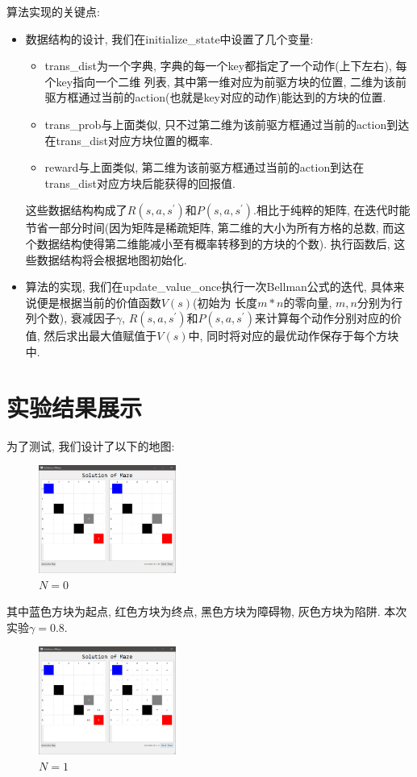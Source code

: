 \documentclass{acm_proc_article-sp}
\begin{document}
算法实现的关键点:
\begin{itemize}
    \item 数据结构的设计, 我们在\textsf{initialize\_state}中设置了几个变量: 
    \begin{itemize}
        \item \textsf{trans\_dist}为一个字典, 字典的每一个key都指定了一个动作(上下左右), 每个key指向一个二维
        列表, 其中第一维对应为前驱方块的位置, 二维为该前驱方框通过当前的action(也就是key对应的动作)能达到的方块的位置.
        \item \textsf{trans\_prob}与上面类似, 只不过第二维为该前驱方框通过当前的action到达在\textsf{trans\_dist}对应方块位置的概率.
        \item \textsf{reward}与上面类似, 第二维为该前驱方框通过当前的action到达在\textsf{trans\_dist}对应方块后能获得的回报值.
    \end{itemize}
    这些数据结构构成了$R(s, a, s^\prime)$和$P(s, a, s^\prime)$.相比于纯粹的矩阵, 在迭代时能节省一部分时间(因为矩阵是稀疏矩阵, 第二维的大小为所有方格的总数, 
    而这个数据结构使得第二维能减小至有概率转移到的方块的个数). 执行函数后, 这些数据结构将会根据地图初始化.
    \item 算法的实现, 我们在\textsf{update\_value\_once}执行一次Bellman公式的迭代, 具体来说便是根据当前的价值函数$V(s)$(初始为
    长度$m*n$的零向量, $m, n$分别为行列个数), 衰减因子$\gamma$, $R(s, a, s^\prime)$和$P(s, a, s^\prime)$来计算每个动作分别对应的价值, 
    然后求出最大值赋值于$V(s)$中, 同时将对应的最优动作保存于每个方块中.
\end{itemize}

\section{实验结果展示}

为了测试, 我们设计了以下的地图:
\begin{figure}[H]
    \centering
    \caption{$N=0$}
    \includegraphics[width=0.4\textwidth]{figure1.png}
\end{figure}

其中蓝色方块为起点, 红色方块为终点, 黑色方块为障碍物, 灰色方块为陷阱. 本次实验$\gamma = 0.8$.
\begin{figure}[H]
    \centering
    \caption{$N=1$}
    \includegraphics[width=0.4\textwidth]{figure2.png}
\end{figure}
\end{document}
